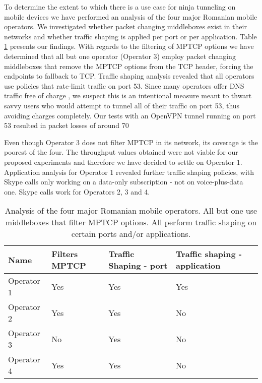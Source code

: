 
To determine the extent to which there is a use case for ninja tunneling on mobile devices we have performed an analysis of the four major Romanian mobile operators. We investigated whether packet changing middleboxes exist in their networks and whether traffic shaping is applied per port or per application. Table \ref{table:operators} presents our findings. With regards to the filtering of MPTCP options we have determined that all but one operator (Operator 3) employ packet changing middleboxes that remove the MPTCP options from the TCP header, forcing the endpoints to fallback to TCP. Traffic shaping analysis revealed that all operators use policies that rate-limit traffic on port 53. Since many operators offer DNS traffic free of charge \cite{freedns}, we suspect this is an intentional measure meant to thwart savvy users who would attempt to tunnel all of their traffic on port 53, thus avoiding charges completely. Our tests with an OpenVPN tunnel running on port 53 resulted in packet losses of around 70%

Even though Operator 3 does not filter MPTCP in its network, its coverage is the poorest of the four. The throughput values obtained were not viable for our proposed experiments and therefore we have decided to settle on Operator 1. Application analysis for Operator 1 revealed further traffic shaping policies, with Skype calls only working on a data-only subscription - not on voice-plus-data one. Skype calls work for Operators 2, 3 and 4.

\begin{center}
    \begin{table}
    \centering
    \begin{tabular}{ | l | l | l | l | }
    \hline
    Name & Filters MPTCP & Traffic Shaping - port & Traffic shaping - application \\ \hline
    Operator 1 & Yes & Yes & Yes  \\ \hline
    Operator 2 & Yes & Yes & No \\ \hline
    Operator 3 & No & Yes & No \\ \hline
    Operator 4 & Yes & Yes & No \\ \hline
    \end{tabular}
    \caption{Analysis of the four major Romanian mobile operators. All but one use middleboxes that filter MPTCP options. All perform traffic shaping on certain ports and/or applications. }
    \label{table:operators}
    \end{table}
\end{center}

